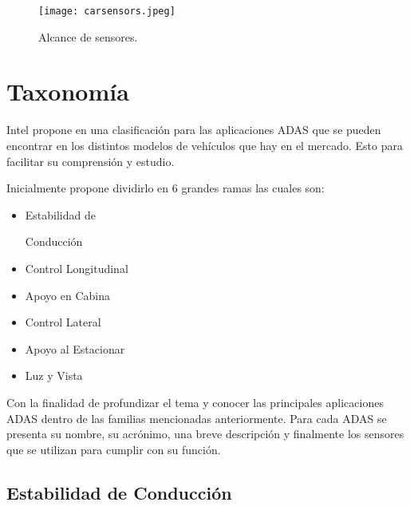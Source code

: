 \begin{figure}[H]
  \centering
  \texttt{[image: carsensors.jpeg]}
  \caption{Alcance de sensores.}
  \label{fig:boat2}
\end{figure}

\section{Taxonomía}

Intel propone en \cite{Intel2016} una clasificación para las aplicaciones ADAS que se pueden encontrar en los distintos modelos de vehículos que hay en el mercado. Esto para facilitar su comprensión y estudio. 

Inicialmente propone dividirlo en 6 grandes ramas las cuales son:
\begin{multicols}{3}

\begin{itemize}
    \item {Estabilidad de
    
    Conducción}
\end{itemize}
\begin{itemize}
    \item {Control Longitudinal}
\end{itemize}
\begin{itemize}
    \item {Apoyo en Cabina}
\end{itemize}
\begin{itemize}
    \item {Control Lateral}
\end{itemize}
\begin{itemize}
    \item {Apoyo al Estacionar}
\end{itemize}
\begin{itemize}
    \item { Luz y Vista}
\end{itemize}

\end{multicols}

Con la finalidad de profundizar el tema y conocer las principales aplicaciones ADAS dentro de las familias mencionadas anteriormente. Para cada ADAS se presenta su nombre, su acrónimo, una breve descripción y finalmente los sensores que se utilizan para cumplir con su función.  

\newpage

\subsection{Estabilidad de Conducción}

